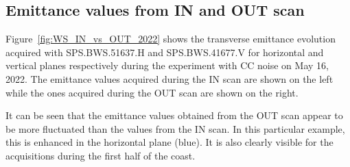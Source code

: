 

 \subsection{Emittance values from IN and OUT scan}\label{subsec:ex_emit_growth_in_vs_out}
 Figure~\ref{fig:WS_IN_vs_OUT_2022} shows the transverse emittance evolution acquired with  SPS.BWS.51637.H and SPS.BWS.41677.V for horizontal and vertical planes respectively during the experiment with CC noise on May 16, 2022. The emittance values acquired during the IN scan are shown on the left while the ones acquired during the OUT scan are shown on the right. 

It can be seen that the emittance values obtained from the OUT scan appear to be more fluctuated than the values from the IN scan. In this particular example, this is enhanced in the horizontal plane (blue). It is also clearly visible for the acquisitions during the first half of the coast.

